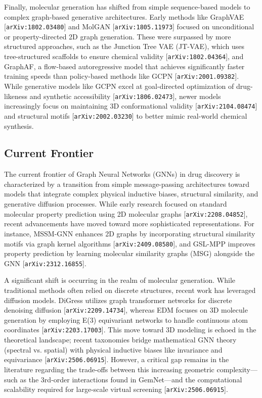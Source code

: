 \documentclass[11pt]{article}
\begin{document}
Finally, molecular generation has shifted from simple sequence-based models to complex graph-based generative architectures. Early methods like GraphVAE [\texttt{arXiv:1802.03480}] and MolGAN [\texttt{arXiv:1805.11973}] focused on unconditional or property-directed 2D graph generation. These were surpassed by more structured approaches, such as the Junction Tree VAE (JT-VAE), which uses tree-structured scaffolds to ensure chemical validity [\texttt{arXiv:1802.04364}], and GraphAF, a flow-based autoregressive model that achieves significantly faster training speeds than policy-based methods like GCPN [\texttt{arXiv:2001.09382}]. While generative models like GCPN excel at goal-directed optimization of drug-likeness and synthetic accessibility [\texttt{arXiv:1806.02473}], newer models increasingly focus on maintaining 3D conformational validity [\texttt{arXiv:2104.08474}] and structural motifs [\texttt{arXiv:2002.03230}] to better mimic real-world chemical synthesis.

\subsection{Current Frontier}

The current frontier of Graph Neural Networks (GNNs) in drug discovery is characterized by a transition from simple message-passing architectures toward models that integrate complex physical inductive biases, structural similarity, and generative diffusion processes. While early research focused on standard molecular property prediction using 2D molecular graphs [\texttt{arXiv:2208.04852}], recent advancements have moved toward more sophisticated representations. For instance, MSSM-GNN enhances 2D graphs by incorporating structural similarity motifs via graph kernel algorithms [\texttt{arXiv:2409.08580}], and GSL-MPP improves property prediction by learning molecular similarity graphs (MSG) alongside the GNN [\texttt{arXiv:2312.16855}].

A significant shift is occurring in the realm of molecular generation. While traditional methods often relied on discrete structures, recent work has leveraged diffusion models. DiGress utilizes graph transformer networks for discrete denoising diffusion [\texttt{arXiv:2209.14734}], whereas EDM focuses on 3D molecule generation by employing E(3) equivariant networks to handle continuous atom coordinates [\texttt{arXiv:2203.17003}]. This move toward 3D modeling is echoed in the theoretical landscape; recent taxonomies bridge mathematical GNN theory (spectral vs. spatial) with physical inductive biases like invariance and equivariance [\texttt{arXiv:2506.06915}]. However, a critical gap remains in the literature regarding the trade-offs between this increasing geometric complexity—such as the 3rd-order interactions found in GemNet—and the computational scalability required for large-scale virtual screening [\texttt{arXiv:2506.06915}].
\end{document}
